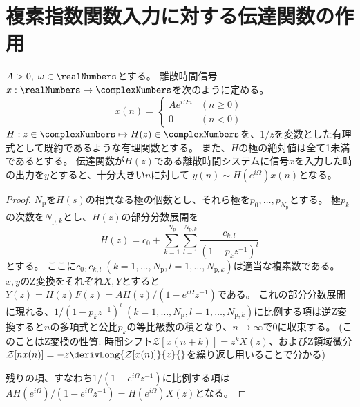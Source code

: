 		\section{複素指数関数入力に対する伝達関数の作用}
			\begin{shadebox}
				$A>0,\;\omega \in \realNumbers$とする。
				離散時間信号$x: \realNumbers \to \complexNumbers$を次のように定める。
				\[
					x(n) =
					\begin{cases}
						Ae^{i\Omega n} & (n\geq 0) \\
						0 & (n<0)
					\end{cases}
				\]
				$H: z\in\complexNumbers \mapsto H(z) \in \complexNumbers$を、$1/z$を変数とした有理式として既約であるような有理関数とする。
				また、$H$の極の絶対値は全て1未満であるとする。
				伝達関数が$H(z)$である離散時間システムに信号$x$を入力した時の出力を$y$とすると、十分大きい$n$に対して
				$y(n) \sim H(e^{i\Omega})x(n)$となる。
			\end{shadebox}
			\begin{proof}
				\quad\par
				$N_\text{p}$を$H(s)$の相異なる極の個数とし、それら極を$p_0,\dots,p_{N_\text{p}}$とする。
				極$p_k$の次数を$N_{\text{p},k}$とし、$H(z)$の部分分数展開を
				\[ H(z) = c_0 + \sum_{k=1}^{N_\mathrm{p}} \sum_{l=1}^{N_{\mathrm{p},k}} \frac{c_{k,l}}{(1-p_kz^{-1})^l} \]
				とする。
				ここに$c_0,c_{k,l}\;(k=1,\dots,N_\mathrm{p},l=1,\dots,N_{\mathrm{p},k})$は適当な複素数である。
				$x,y$のZ変換をそれぞれ$X,Y$とすると$Y(z) = H(z)F(z) = A H(z)/(1-e^{i\Omega}z^{-1})$である。
				これの部分分数展開に現れる、$1/(1-p_k z^{-1})^l\;(k=1,\dots,N_\mathrm{p},l=1,\dots,N_{\mathrm{p},k})$に比例する項は逆Z変換すると$n$の多項式と公比$p_k$の等比級数の積となり、$n\to\infty$で0に収束する。
				(このことはZ変換の性質: 時間シフト$\mathcal{Z}[x(n+k)] = z^kX(z)$、およびZ領域微分$\mathcal{Z}[nx(n)] = -z\derivLong{\mathcal{Z}[x(n)]}{z}{}$を繰り返し用いることで分かる)
				\par
				残りの項、すなわち$1/(1-e^{i\Omega}z^{-1})$に比例する項は$AH(e^{i\Omega})/(1-e^{i\Omega}z^{-1}) = H(e^{i\Omega})X(z)$となる。
			\end{proof}
